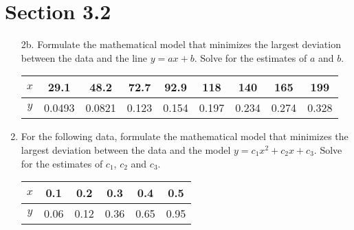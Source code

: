 \documentclass[10pt]{report}
\begin{document}
\section*{Section 3.2}
\begin{enumerate}
	\item [2b.]
	Formulate the mathematical model that minimizes the largest deviation between the data and the line $y=ax+b$. Solve for the estimates of $a$ and $b$.
	\begin{table}[H]
		\centering
		\begin{tabular}{*{9}{c}} 
			\toprule
			$x$ & 29.1 & 48.2 & 72.7 & 92.9 & 118 & 140 & 165 & 199\\ \midrule
			$y$ & 0.0493 & 0.0821 & 0.123 & 0.154 & 0.197 & 0.234 & 0.274 & 0.328 \\
			\bottomrule
		\end{tabular}
	\end{table}

	\item 
	For the following data, formulate the mathematical model that minimizes the largest deviation between the data and the model $y = c_1 x^2 + c_2 x + c_3$. Solve for the estimates of $c_1$, $c_2$ and $c_3$.
	\begin{table}[H]
		\centering
		\begin{tabular}{*{6}{c}} 
			\toprule
			$x$ & 0.1 & 0.2 & 0.3 & 0.4 & 0.5 \\ \midrule
			$y$ & 0.06 & 0.12 & 0.36 & 0.65 & 0.95 \\
			\bottomrule
		\end{tabular}
	\end{table}
\end{enumerate}
\end{document}
